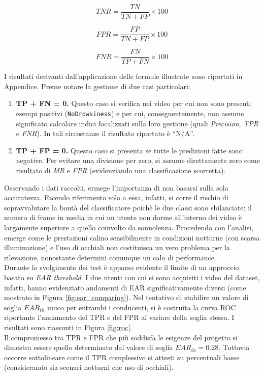 \documentclass[12pt]{article}
\newcommand{\quotes}[1]{``#1''}
\begin{document}
\begin{equation}
TNR = \frac{TN}{TN + FP} \times 100
\end{equation}

\begin{equation}
FPR = \frac{FP}{TN + FP} \times 100
\end{equation}

\begin{equation}
FNR = \frac{FN}{TP + FN} \times 100
\end{equation}

\vspace{0.5cm}
I risultati derivanti dall'applicazione delle formule illustrate sono riportati in Appendice. Preme notare la gestione di due casi particolari:
\begin{enumerate}
	\item \textbf{TP + FN = 0.} Questo caso si verifica nei video per cui non sono presenti esempi positivi (\texttt{NoDrowsiness}) e per cui, conseguentemente, non assume significato calcolare indici focalizzati sulla loro gestione (quali \textit{Precision}, \textit{TPR} e \textit{FNR}). In tali circostanze il risultato riportato è \quotes{N/A}. 
	\item \textbf{TP + FP = 0.} Questo caso si presenta se tutte le predizioni fatte sono negative. Per evitare una divisione per zero, si assume direttamente zero come risultato di \textit{MR} e \textit{FPR} (evidenziando una classificazione scorretta). 
\end{enumerate}

Osservando i dati raccolti, ermege l'importanza di non basarsi sulla sola accuratezza. Facendo riferimento solo a essa, infatti, si corre il rischio di sopravvalutare la bontà del classificatore poichè le due classi sono sbilanciate: il numero di frame in media in cui un utente non dorme all'interno dei video è largamente superiore a quello coinvolto da sonnolenza. Procedendo con l'analisi, emerge come le prestazioni calino sensibilmente in condizioni notturne (con scarsa illuminazione) e l'uso di occhiali non costituisca un vero problema per la rilevazione, nonostante determini comunque un calo di performance.\\

Durante lo svolgimento dei test è apparso evidente il limite di un approccio basato su \textit{EAR threshold}. I due utenti con cui si sono acquisiti i video del dataset, infatti, hanno evidenziato andamenti di EAR significativamente diversi (come mostrato in Figura \ref{fig:ear_comparing}).
Nel tentativo di stabilire un valore di soglia $EAR_{th}$ unico per entrambi i conducenti, si è costruita la curva ROC riportante l'andamento del TPR e del FPR al variare della soglia stessa. I risultati sono riassunti in Figura \ref{fig:roc}.\\
Il compromesso tra TPR e FPR che più soddisfa le esigenze del progetto si dimostra essere quello determinato dal valore di soglia $EAR_{th} = 0.28$. Tuttavia occorre sottolineare come il TPR complessivo si attesti su percentuali basse (considerando sia scenari notturni che uso di occhiali).
\end{document}

